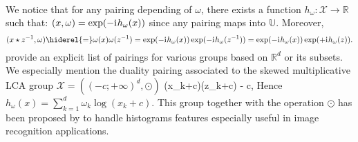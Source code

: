 \paragraph{}
We notice that for any pairing depending of $\omega$, there exists a function $h_{\omega}: \mathcal{X} \to \mathbb{R}$ such that: $(x,\omega)= \exp(-{\mathrm{i}\mkern1mu} h_{\omega}(x))$ since any pairing maps into $\mathbb{U}$. Moreover, 
\begin{dmath*}
(x \groupop \inv{z},\omega) \hiderel{=} \omega(x)\omega(\inv{z}) =\exp(-\iu h_{\omega}(x))\exp(-\iu h_{\omega}(\inv{z}))
=\exp(-\iu h_{\omega}(x))\exp(+\iu h_{\omega}(z)).
\end{dmath*}
 provide an explicit list of pairings for various groups based on $\mathbb{R}^d$ or its subsets. We especially mention the duality pairing associated to the skewed multiplicative \acs{LCA} group $\mathcal{X}=((-c;+\infty)^d, \odot)$
 (x_k+c)(z_k+c) - c,
Hence $h_\omega(x)=\sum_{k=1}^d\omega_k \log(x_k+c)$. This group together with the operation $\odot$ has  been proposed by \cite{li2010random} to handle histograms features especially useful in image recognition applications.
